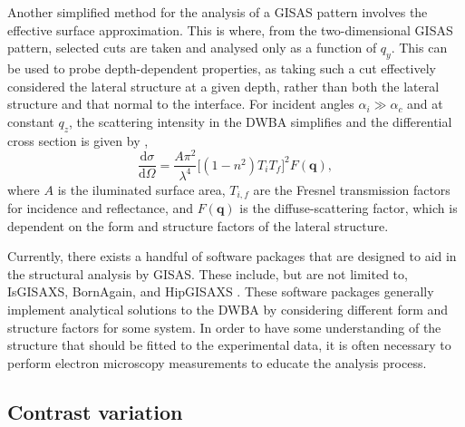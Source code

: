 Another simplified method for the analysis of a GISAS pattern involves the effective surface approximation.
This is where, from the two-dimensional GISAS pattern, selected cuts are taken and analysed only as a function of $q_y$.
This can be used to probe depth-dependent properties, as taking such a cut effectively considered the lateral structure at a given depth, rather than both the lateral structure and that normal to the interface.
For incident angles $\alpha_i \gg \alpha_c$ and at constant $q_z$, the scattering intensity in the DWBA simplifies and the differential cross section is given by \cite{naudon_grazing-incidence_2000},
%
\begin{equation}
    \frac{\text{d}\sigma}{\text{d}\Omega} = \frac{A\pi^2}{\lambda^4}\big[(1 - n^2)T_iT_f\big]^2F(\mathbf{q}),
\end{equation}
%
where $A$ is the iluminated surface area, $T_{i,f}$ are the Fresnel transmission factors for incidence and reflectance, and $F(\mathbf{q})$ is the diffuse-scattering factor, which is dependent on the form and structure factors of the lateral structure.

Currently, there exists a handful of software packages that are designed to aid in the structural analysis by GISAS.
These include, but are not limited to, IsGISAXS, BornAgain, and HipGISAXS \cite{lazzari_isgisaxs_2002,burle_bornagain_nodate,chourou_hipgisaxs_2013}.
These software packages generally implement analytical solutions to the DWBA by considering different form and structure factors for some system.
In order to have some understanding of the structure that should be fitted to the experimental data, it is often necessary to perform electron microscopy measurements to educate the analysis process.


\subsection{Contrast variation}
\label{convar}

